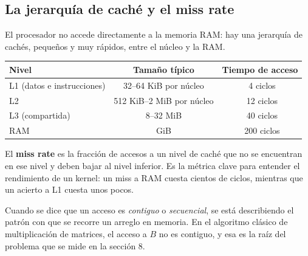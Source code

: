 \subsection{La jerarquía de caché y el miss rate}

El procesador no accede directamente a la memoria RAM: hay una jerarquía de cachés, pequeños y muy rápidos, entre el núcleo y la RAM.

\begin{center}
\begin{tabular}{|l|c|c|}
\hline
\textbf{Nivel} & \textbf{Tamaño típico} & \textbf{Tiempo de acceso} \\
\hline
L1 (datos e instrucciones) & 32--64 KiB por núcleo & ~4 ciclos \\
L2 & 512 KiB--2 MiB por núcleo & ~12 ciclos \\
L3 (compartida) & 8--32 MiB & ~40 ciclos \\
RAM & GiB & ~200 ciclos \\
\hline
\end{tabular}
\end{center}

El \textbf{miss rate} es la fracción de accesos a un nivel de caché que no se encuentran en ese nivel y deben bajar al nivel inferior. Es la métrica clave para entender el rendimiento de un kernel: un miss a RAM cuesta cientos de ciclos, mientras que un acierto a L1 cuesta unos pocos.

Cuando se dice que un acceso es \emph{contiguo} o \emph{secuencial}, se está describiendo el patrón con que se recorre un arreglo en memoria. En el algoritmo clásico de multiplicación de matrices, el acceso a $B$ no es contiguo, y esa es la raíz del problema que se mide en la sección 8.
